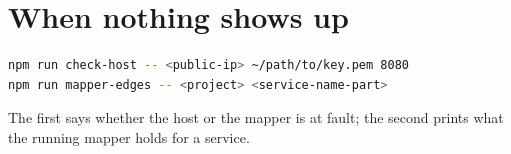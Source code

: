 \section*{When nothing shows up}
\begin{lstlisting}[language=bash,numbers=none]
npm run check-host -- <public-ip> ~/path/to/key.pem 8080
npm run mapper-edges -- <project> <service-name-part>
\end{lstlisting}
The first says whether the host or the mapper is at fault; the second prints what the running mapper holds for a service.
